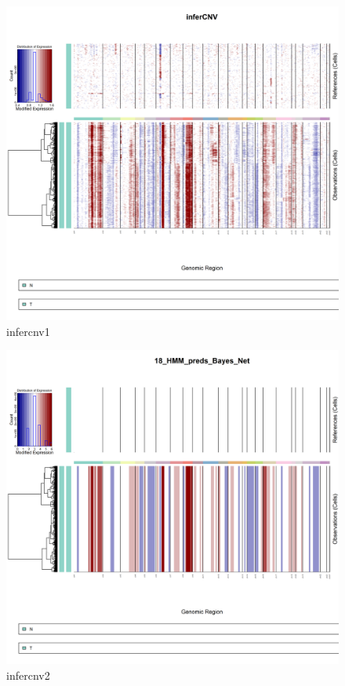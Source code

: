 \documentclass[
]{book}
\begin{document}
\begin{figure}
\centering
\includegraphics{./CNV_analysis_file/figs/tnbc1_demo1/infercnv.png}
\caption{infercnv1}
\end{figure}

\begin{figure}
\centering
\includegraphics{./CNV_analysis_file/figs/tnbc1_demo1/infercnv.18_HMM_pred.Bayes_Net.Pnorm_0.5.png}
\caption{infercnv2}
\end{figure}
\end{document}
